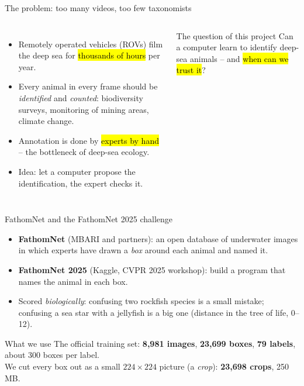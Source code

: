 \documentclass[aspectratio=169,11pt]{beamer}
\title{\coursetitle}
\subtitle{\coursesubtitle\\[2pt]\small Session 1 -- Kick-off and roadmap}
\date{}
\author{}
\begin{document}
\maketitle

\begin{frame}{The problem: too many videos, too few taxonomists}
\begin{columns}[T]
\begin{itemize}
  \item Remotely operated vehicles (ROVs) film the deep sea for \hl{thousands of hours} per year.
  \item Every animal in every frame should be \emph{identified} and \emph{counted}: biodiversity surveys, monitoring of mining areas, climate change.
  \item Annotation is done by \hl{experts by hand} -- the bottleneck of deep-sea ecology.
  \item Idea: let a computer propose the identification, the expert checks it.
\end{itemize}
\begin{block}{The question of this project}
\large Can a computer learn to identify deep-sea animals -- and \hl{when can we trust it}?
\end{block}
\end{columns}
\end{frame}

\begin{frame}{FathomNet and the FathomNet 2025 challenge}
\begin{itemize}
  \item \textbf{FathomNet} (MBARI and partners): an open database of underwater images in which experts have drawn a \emph{box} around each animal and named it.
  \item \textbf{FathomNet 2025} (Kaggle, CVPR 2025 workshop): build a program that names the animal in each box.
  \item Scored \emph{biologically}: confusing two rockfish species is a small mistake; confusing a sea star with a jellyfish is a big one (distance in the tree of life, 0--12).
\end{itemize}
\vspace{4pt}
\begin{exampleblock}{What we use}
The official training set: \textbf{8,981 images}, \textbf{23,699 boxes}, \textbf{79 labels}, about 300 boxes per label.\\
We cut every box out as a small $224\times224$ picture (a \emph{crop}): \textbf{23,698 crops}, 250\,MB.
\end{exampleblock}
\end{frame}
\end{document}
